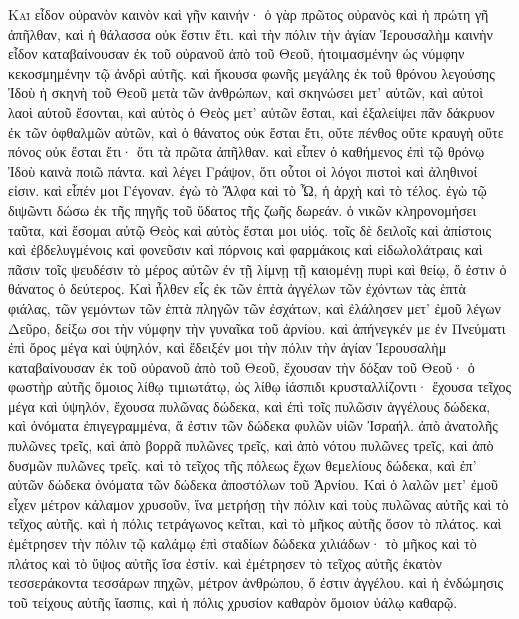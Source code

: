 \begin{pages}
    \begin{Rightside}
        \beginnumbering
		\renewcommand{\LettrineFontHook}{\PHtitl}
		\lettrine[lines=3]{Κ}{αὶ} εἶδον οὐρανὸν καινὸν καὶ γῆν καινήν· ὁ γὰρ πρῶτος οὐρανὸς καὶ ἡ πρώτη γῆ ἀπῆλθαν, καὶ ἡ θάλασσα οὐκ ἔστιν ἔτι. καὶ τὴν πόλιν τὴν ἁγίαν Ἱερουσαλὴμ καινὴν εἶδον καταβαίνουσαν ἐκ τοῦ οὐρανοῦ ἀπὸ τοῦ Θεοῦ, ἡτοιμασμένην ὡς νύμφην κεκοσμημένην τῷ ἀνδρὶ αὐτῆς. καὶ ἤκουσα φωνῆς μεγάλης ἐκ τοῦ θρόνου λεγούσης Ἰδοὺ ἡ σκηνὴ τοῦ Θεοῦ μετὰ τῶν ἀνθρώπων, καὶ σκηνώσει μετ’ αὐτῶν, καὶ αὐτοὶ λαοὶ αὐτοῦ ἔσονται, καὶ αὐτὸς ὁ Θεὸς μετ’ αὐτῶν ἔσται, καὶ ἐξαλείψει πᾶν δάκρυον ἐκ τῶν ὀφθαλμῶν αὐτῶν, καὶ ὁ θάνατος οὐκ ἔσται ἔτι, οὔτε πένθος οὔτε κραυγὴ οὔτε πόνος οὐκ ἔσται ἔτι· ὅτι τὰ πρῶτα ἀπῆλθαν. 
		\pend
		\pstart
		καὶ εἶπεν ὁ καθήμενος ἐπὶ τῷ θρόνῳ Ἰδοὺ καινὰ ποιῶ πάντα. καὶ λέγει Γράψον, ὅτι οὗτοι οἱ λόγοι πιστοὶ καὶ ἀληθινοί εἰσιν. καὶ εἶπέν μοι Γέγοναν. ἐγὼ τὸ Ἄλφα καὶ τὸ Ὦ, ἡ ἀρχὴ καὶ τὸ τέλος. ἐγὼ τῷ διψῶντι δώσω ἐκ τῆς πηγῆς τοῦ ὕδατος τῆς ζωῆς δωρεάν. ὁ νικῶν κληρονομήσει ταῦτα, καὶ ἔσομαι αὐτῷ Θεὸς καὶ αὐτὸς ἔσται μοι υἱός. τοῖς δὲ δειλοῖς καὶ ἀπίστοις καὶ ἐβδελυγμένοις καὶ φονεῦσιν καὶ πόρνοις καὶ φαρμάκοις καὶ εἰδωλολάτραις καὶ πᾶσιν τοῖς ψευδέσιν τὸ μέρος αὐτῶν ἐν τῇ λίμνῃ τῇ καιομένῃ πυρὶ καὶ θείῳ, ὅ ἐστιν ὁ θάνατος ὁ δεύτερος.
		\pend
		\pstart
		Καὶ ἦλθεν εἷς ἐκ τῶν ἑπτὰ ἀγγέλων τῶν ἐχόντων τὰς ἑπτὰ φιάλας, τῶν γεμόντων τῶν ἑπτὰ πληγῶν τῶν ἐσχάτων, καὶ ἐλάλησεν μετ’ ἐμοῦ λέγων Δεῦρο, δείξω σοι τὴν νύμφην τὴν γυναῖκα τοῦ ἀρνίου. καὶ ἀπήνεγκέν με ἐν Πνεύματι ἐπὶ ὄρος μέγα καὶ ὑψηλόν, καὶ ἔδειξέν μοι τὴν πόλιν τὴν ἁγίαν Ἱερουσαλὴμ καταβαίνουσαν ἐκ τοῦ οὐρανοῦ ἀπὸ τοῦ Θεοῦ, ἔχουσαν τὴν δόξαν τοῦ Θεοῦ· ὁ φωστὴρ αὐτῆς ὅμοιος λίθῳ τιμιωτάτῳ, ὡς λίθῳ ἰάσπιδι κρυσταλλίζοντι· 
		\pend
		\pstart
		ἔχουσα τεῖχος μέγα καὶ ὑψηλόν, ἔχουσα πυλῶνας δώδεκα, καὶ ἐπὶ τοῖς πυλῶσιν ἀγγέλους δώδεκα, καὶ ὀνόματα ἐπιγεγραμμένα, ἅ ἐστιν τῶν δώδεκα φυλῶν υἱῶν Ἰσραήλ. ἀπὸ ἀνατολῆς πυλῶνες τρεῖς, καὶ ἀπὸ βορρᾶ πυλῶνες τρεῖς, καὶ ἀπὸ νότου πυλῶνες τρεῖς, καὶ ἀπὸ δυσμῶν πυλῶνες τρεῖς. καὶ τὸ τεῖχος τῆς πόλεως ἔχων θεμελίους δώδεκα, καὶ ἐπ’ αὐτῶν δώδεκα ὀνόματα τῶν δώδεκα ἀποστόλων τοῦ Ἀρνίου. 
		\pend
		\pstart
		Καὶ ὁ λαλῶν μετ’ ἐμοῦ εἶχεν μέτρον κάλαμον χρυσοῦν, ἵνα μετρήσῃ τὴν πόλιν καὶ τοὺς πυλῶνας αὐτῆς καὶ τὸ τεῖχος αὐτῆς. καὶ ἡ πόλις τετράγωνος κεῖται, καὶ τὸ μῆκος αὐτῆς ὅσον τὸ πλάτος. καὶ ἐμέτρησεν τὴν πόλιν τῷ καλάμῳ ἐπὶ σταδίων δώδεκα χιλιάδων· τὸ μῆκος καὶ τὸ πλάτος καὶ τὸ ὕψος αὐτῆς ἴσα ἐστίν. καὶ ἐμέτρησεν τὸ τεῖχος αὐτῆς ἑκατὸν τεσσεράκοντα τεσσάρων πηχῶν, μέτρον ἀνθρώπου, ὅ ἐστιν ἀγγέλου. καὶ ἡ ἐνδώμησις τοῦ τείχους αὐτῆς ἴασπις, καὶ ἡ πόλις χρυσίον καθαρὸν ὅμοιον ὑάλῳ καθαρῷ. 

\end{Rightside}
\end{pages}
